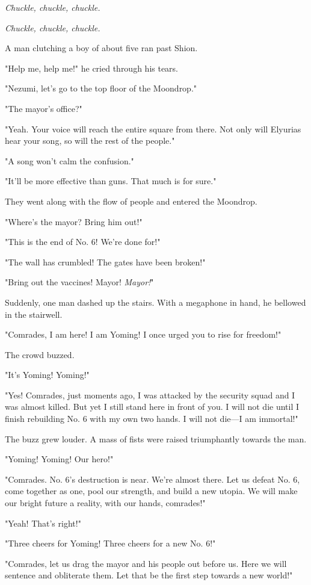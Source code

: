 \emph{Chuckle, chuckle, chuckle.}

\emph{Chuckle, chuckle, chuckle.}

A man clutching a boy of about five ran past Shion.

"Help me, help me!" he cried through his tears.

"Nezumi, let's go to the top floor of the Moondrop."

"The mayor's office?"

"Yeah. Your voice will reach the entire square from there. Not only will
Elyurias hear your song, so will the rest of the people."

"A song won't calm the confusion."

"It'll be more effective than guns. That much is for sure."

They went along with the flow of people and entered the Moondrop.

"Where's the mayor? Bring him out!"

"This is the end of No. 6! We're done for!"

"The wall has crumbled! The gates have been broken!"

"Bring out the vaccines! Mayor! \emph{Mayor!}"

Suddenly, one man dashed up the stairs. With a megaphone in hand, he
bellowed in the stairwell.

"Comrades, I am here! I am Yoming! I once urged you to rise for
freedom!"

The crowd buzzed.

"It's Yoming! Yoming!"

"Yes! Comrades, just moments ago, I was attacked by the security squad
and I was almost killed. But yet I still stand here in front of you. I
will not die until I finish rebuilding No. 6 with my own two hands. I
will not die---I am immortal!"

The buzz grew louder. A mass of fists were raised triumphantly towards
the man.

"Yoming! Yoming! Our hero!"

"Comrades. No. 6's destruction is near. We're almost there. Let us
defeat No. 6, come together as one, pool our strength, and build a new
utopia. We will make our bright future a reality, with our hands,
comrades!"

"Yeah! That's right!"

"Three cheers for Yoming! Three cheers for a new No. 6!"

"Comrades, let us drag the mayor and his people out before us. Here we
will sentence and obliterate them. Let that be the first step towards a
new world!"

